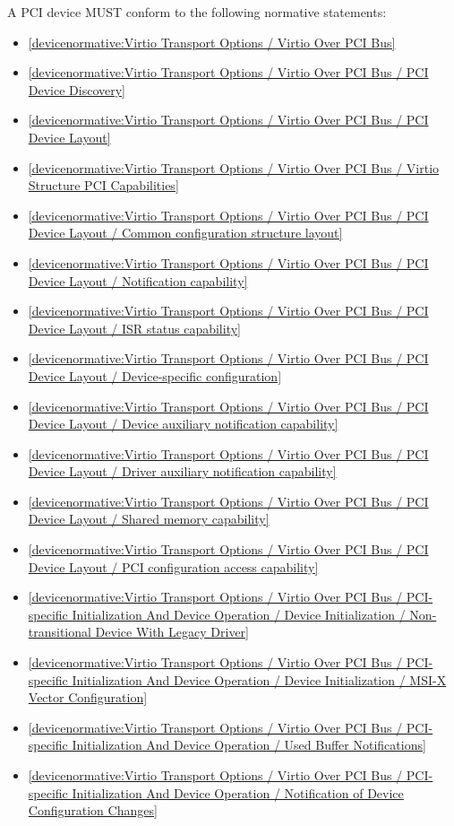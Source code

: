 \label{sec:Conformance / Device Conformance / PCI Device Conformance}

A PCI device MUST conform to the following normative statements:

\begin{itemize}
\item \ref{devicenormative:Virtio Transport Options / Virtio Over PCI Bus}
\item \ref{devicenormative:Virtio Transport Options / Virtio Over PCI Bus / PCI Device Discovery}
\item \ref{devicenormative:Virtio Transport Options / Virtio Over PCI Bus / PCI Device Layout}
\item \ref{devicenormative:Virtio Transport Options / Virtio Over PCI Bus / Virtio Structure PCI Capabilities}
\item \ref{devicenormative:Virtio Transport Options / Virtio Over PCI Bus / PCI Device Layout / Common configuration structure layout}
\item \ref{devicenormative:Virtio Transport Options / Virtio Over PCI Bus / PCI Device Layout / Notification capability}
\item \ref{devicenormative:Virtio Transport Options / Virtio Over PCI Bus / PCI Device Layout / ISR status capability}
\item \ref{devicenormative:Virtio Transport Options / Virtio Over PCI Bus / PCI Device Layout / Device-specific configuration}
\item \ref{devicenormative:Virtio Transport Options / Virtio Over PCI Bus / PCI Device Layout / Device auxiliary notification capability}
\item \ref{devicenormative:Virtio Transport Options / Virtio Over PCI Bus / PCI Device Layout / Driver auxiliary notification capability}
\item \ref{devicenormative:Virtio Transport Options / Virtio Over PCI Bus / PCI Device Layout / Shared memory capability}
\item \ref{devicenormative:Virtio Transport Options / Virtio Over PCI Bus / PCI Device Layout / PCI configuration access capability}
\item \ref{devicenormative:Virtio Transport Options / Virtio Over PCI Bus / PCI-specific Initialization And Device Operation / Device Initialization / Non-transitional Device With Legacy Driver}
\item \ref{devicenormative:Virtio Transport Options / Virtio Over PCI Bus / PCI-specific Initialization And Device Operation / Device Initialization / MSI-X Vector Configuration}
\item \ref{devicenormative:Virtio Transport Options / Virtio Over PCI Bus / PCI-specific Initialization And Device Operation / Used Buffer Notifications}
\item \ref{devicenormative:Virtio Transport Options / Virtio Over PCI Bus / PCI-specific Initialization And Device Operation / Notification of Device Configuration Changes}
\end{itemize}

